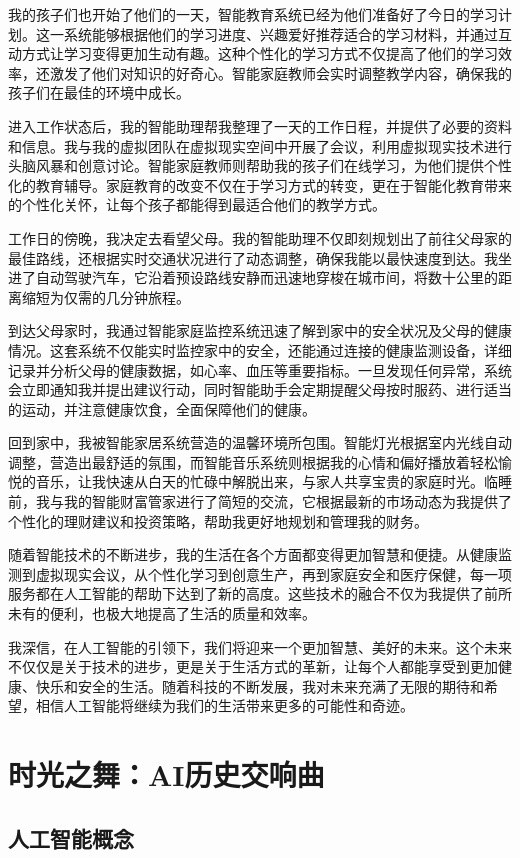 我的孩子们也开始了他们的一天，智能教育系统已经为他们准备好了今日的学习计划。这一系统能够根据他们的学习进度、兴趣爱好推荐适合的学习材料，并通过互动方式让学习变得更加生动有趣。这种个性化的学习方式不仅提高了他们的学习效率，还激发了他们对知识的好奇心。智能家庭教师会实时调整教学内容，确保我的孩子们在最佳的环境中成长。

进入工作状态后，我的智能助理帮我整理了一天的工作日程，并提供了必要的资料和信息。我与我的虚拟团队在虚拟现实空间中开展了会议，利用虚拟现实技术进行头脑风暴和创意讨论。智能家庭教师则帮助我的孩子们在线学习，为他们提供个性化的教育辅导。家庭教育的改变不仅在于学习方式的转变，更在于智能化教育带来的个性化关怀，让每个孩子都能得到最适合他们的教学方式。

工作日的傍晚，我决定去看望父母。我的智能助理不仅即刻规划出了前往父母家的最佳路线，还根据实时交通状况进行了动态调整，确保我能以最快速度到达。我坐进了自动驾驶汽车，它沿着预设路线安静而迅速地穿梭在城市间，将数十公里的距离缩短为仅需的几分钟旅程。

到达父母家时，我通过智能家庭监控系统迅速了解到家中的安全状况及父母的健康情况。这套系统不仅能实时监控家中的安全，还能通过连接的健康监测设备，详细记录并分析父母的健康数据，如心率、血压等重要指标。一旦发现任何异常，系统会立即通知我并提出建议行动，同时智能助手会定期提醒父母按时服药、进行适当的运动，并注意健康饮食，全面保障他们的健康。

回到家中，我被智能家居系统营造的温馨环境所包围。智能灯光根据室内光线自动调整，营造出最舒适的氛围，而智能音乐系统则根据我的心情和偏好播放着轻松愉悦的音乐，让我快速从白天的忙碌中解脱出来，与家人共享宝贵的家庭时光。临睡前，我与我的智能财富管家进行了简短的交流，它根据最新的市场动态为我提供了个性化的理财建议和投资策略，帮助我更好地规划和管理我的财务。

随着智能技术的不断进步，我的生活在各个方面都变得更加智慧和便捷。从健康监测到虚拟现实会议，从个性化学习到创意生产，再到家庭安全和医疗保健，每一项服务都在人工智能的帮助下达到了新的高度。这些技术的融合不仅为我提供了前所未有的便利，也极大地提高了生活的质量和效率。

我深信，在人工智能的引领下，我们将迎来一个更加智慧、美好的未来。这个未来不仅仅是关于技术的进步，更是关于生活方式的革新，让每个人都能享受到更加健康、快乐和安全的生活。随着科技的不断发展，我对未来充满了无限的期待和希望，相信人工智能将继续为我们的生活带来更多的可能性和奇迹。

\section{时光之舞：AI历史交响曲}
\subsection[人工智能概念]{人工智能概念 }

